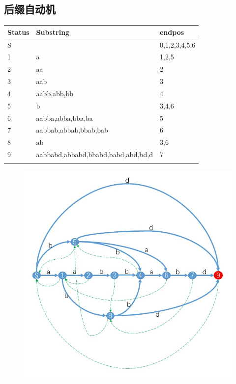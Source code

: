 \documentclass[UTF8,a4paper,titlepage]{ctexart}
\begin{document}
\subsection{后缀自动机}
\begin{tabularx}{10cm}{llX}  %
	\hline
	Status & Substring                          & endpos          \\
	\hline
	S      &                                    & {0,1,2,3,4,5,6} \\
	1      & a                                  & {1,2,5}         \\
	2      & aa                                 & {2}             \\
	3      & aab                                & {3}             \\
	4      & aabb,abb,bb                        & {4}             \\
	5      & b                                  & {3,4,6}         \\
	6      & aabba,abba,bba,ba                  & {5}             \\
	7      & aabbab,abbab,bbab,bab              & {6}             \\
	8      & ab                                 & {3,6}           \\
	9      & aabbabd,abbabd,bbabd,babd,abd,bd,d & {7}             \\
	\hline\label{key}
\end{tabularx}

\begin{figure}[h!]
	\centering
	\includegraphics[scale=0.8]{images/sam.jpg}
	\label{fig:sam}
\end{figure}
\end{document}

